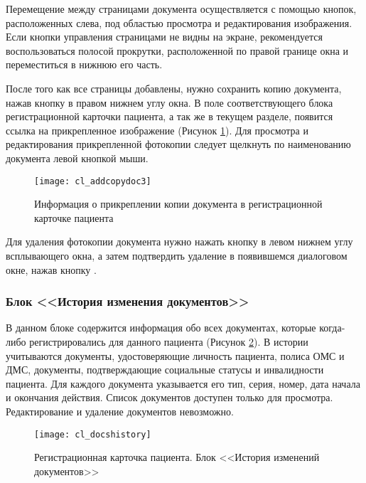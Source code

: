 {Перемещение между страницами документа осуществляется с помощью кнопок, расположенных слева, под областью просмотра и редактирования изображения. Если кнопки управления страницами не видны на экране, рекомендуется воспользоваться полосой прокрутки, расположенной по правой границе окна и переместиться в нижнюю его часть. 

После того как все страницы добавлены, нужно сохранить копию документа, нажав кнопку  в правом нижнем углу окна. В поле  соответствующего блока регистрационной карточки пациента, а так же в текущем разделе, появится ссылка на прикрепленное изображение (Рисунок \ref{img_cl_addcopydoc3}). Для просмотра и редактирования прикрепленной фотокопии следует щелкнуть по наименованию документа левой кнопкой мыши. 

\begin{figure}[ht]\centering
 \texttt{[image: cl\_addcopydoc3]}
 \caption{Информация о прикреплении копии документа в регистрационной карточке пациента}
 \label{img_cl_addcopydoc3}
\end{figure} 

Для удаления фотокопии документа нужно нажать кнопку  в левом нижнем углу всплывающего окна, а затем подтвердить удаление в появившемся диалоговом окне, нажав кнопку .  

\subsubsection{Блок <<История изменения документов>>} \label{cl_docshistory}

В данном блоке содержится информация обо всех документах, которые когда-либо регистрировались для данного пациента (Рисунок \ref{img_cl_docshistory}). В истории учитываются документы, удостоверяющие личность пациента, полиса ОМС и ДМС, документы, подтверждающие социальные статусы и инвалидности пациента. Для каждого документа указывается его тип, серия, номер, дата начала и окончания действия. Список документов доступен только для просмотра. Редактирование и удаление документов невозможно. 

\begin{figure}[ht]\centering
 \texttt{[image: cl\_docshistory]}
 \caption{Регистрационная карточка пациента. Блок <<История изменений документов>>}
 \label{img_cl_docshistory}
\end{figure} 


}
